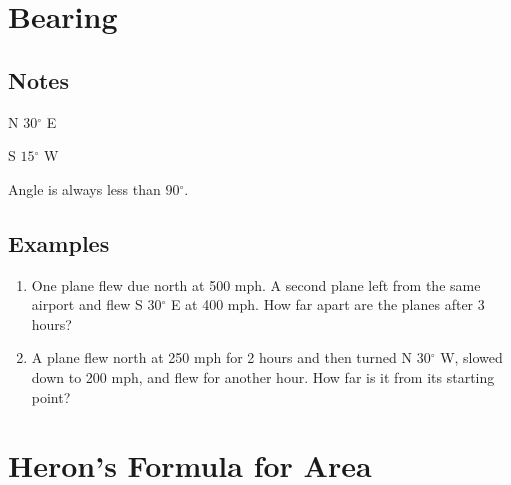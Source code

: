 \documentclass{exam}
\newcommand{\dg}{\ensuremath{^\circ}}
\begin{document}
  \section{Bearing}
  \subsection{Notes}
  \begin{itemize*}
    \item N $30 \dg$ E
    \item S $15 \dg$ W
  \end{itemize*}

  Angle is always less than $90 \dg$.

  \subsection{Examples}
  \begin{enumerate}
    \item One plane flew due north at 500 mph.  A second plane left from the same airport and flew S $30 \dg$ E at 400
      mph.  How far apart are the planes after 3 hours?

    \item A plane flew north at 250 mph for 2 hours and then turned N $30 \dg$ W, slowed down to 200 mph, and flew for
      another hour.  How far is it from its starting point?

  \end{enumerate}

  \section{Heron's Formula for Area}
\end{document}
